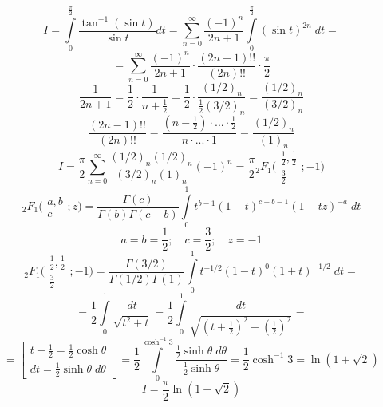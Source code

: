 


	$$I = \int \limits_{0}^{\frac{\pi}{2}} \frac{\tan^{-1} (\sin t)}{\sin t} dt = \sum_{n = 0}^{\infty} \frac{(-1)^n}{2n+1} \int \limits_{0}^{\frac{\pi}{2}} (\sin t)^{2n} \; dt=$$
	$$= \sum_{n = 0}^{\infty} \frac{(-1)^n}{2n+1} \cdot \frac{(2n-1)!!}{(2n)!!} \cdot \frac{\pi}{2} $$
	$$ \frac{1}{2n+1} = \frac{1}{2} \cdot \frac{1}{n+\frac{1}{2}} = \frac{1}{2} \cdot \frac{(1/2)_n}{\frac{1}{2} (3/2)_n} = \frac{(1/2)_n}{(3/2)_n} $$
	$$\frac{(2n-1)!!}{(2n)!!} = \frac{(n-\frac{1}{2})\cdot ... \cdot \frac{1}{2}}{n \cdot ... \cdot 1} = \frac{(1/2)_n}{(1)_n}$$
	$$I = \frac{\pi}{2} \sum_{n = 0}^{\infty} \frac{(1/2)_n (1/2)_n}{(3/2)_n (1)_n} (-1)^n = \frac{\pi}{2} {}_2F_1 \Big(\begin{array}{c}
		\frac{1}{2}, \frac{1}{2} \\ \frac{3}{2}
	\end{array}; -1\Big)$$
	$${}_2F_1 \Big(\begin{array}{c}
		a, b \\ c
	\end{array}; z\Big) = \frac{\Gamma(c)}{\Gamma(b) \Gamma(c-b) } \int \limits_0^1 t^{b-1} (1-t)^{c-b-1} (1-tz)^{-a} \; dt$$
	$$a = b = \frac{1}{2}; \quad c = \frac{3}{2}; \quad z = -1$$
	$${}_2F_1 \Big(\begin{array}{c}
		\frac{1}{2}, \frac{1}{2} \\ \frac{3}{2}
	\end{array}; -1\Big) = \frac{\Gamma(3/2)}{\Gamma(1/2) \Gamma(1) } \int \limits_0^1 t^{-1/2} (1-t)^{0} (1+t)^{-1/2} \; dt = $$
	$$= \frac{1}{2} \int \limits_0^1 \frac{dt}{\sqrt{t^2+t}} = \frac{1}{2} \int \limits_0^1 \frac{dt}{\sqrt{(t+\frac{1}{2})^2-(\frac{1}{2})^2}} =$$
	$$= \left[\begin{array}{c}
		t+\frac{1}{2} = \frac{1}{2} \cosh \theta \\ dt =  \frac{1}{2} \sinh \theta \; d\theta 
	\end{array}\right] = \frac{1}{2}\int \limits_0^{\cosh^{-1} 3} \frac{\frac{1}{2} \sinh \theta \; d\theta}{\frac{1}{2} \sinh \theta} = \frac{1}{2}  \cosh^{-1} 3 = \ln(1+\sqrt{2})$$
	$$I = \frac{\pi}{2} \ln (1+\sqrt{2})$$
